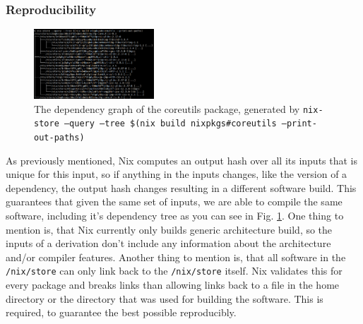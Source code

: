 \documentclass[conference,final,a4paper]{IEEEtran}
\begin{document}
\subsubsection{Reproducibility}

\begin{figure}
    \centering
    \includegraphics[width=0.4\textwidth]{nix-tree.png}
    \caption{The dependency graph of the coreutils package, generated by \texttt{nix-store --query --tree \$(nix build nixpkgs\#coreutils --print-out-paths)}}
    \label{fig:nix-tree}
\end{figure}

As previously mentioned, Nix computes an output hash over all its inputs that is unique for this input, so if anything in the inputs changes, like the version of a dependency, the output hash changes resulting in a different software build.
This guarantees that given the same set of inputs, we are able to compile the same software, including it's dependency tree as you can see in Fig. \ref{fig:nix-tree}.
One thing to mention is, that Nix currently only builds generic architecture build, so the inputs of a derivation don't include any information about the architecture and/or compiler features.
Another thing to mention is, that all software in the \texttt{/nix/store} can only link back to the \texttt{/nix/store} itself.
Nix validates this for every package and breaks links than allowing links back to a file in the home directory or the directory that was used for building the software.
This is required, to guarantee the best possible reproducibly.
\end{document}

